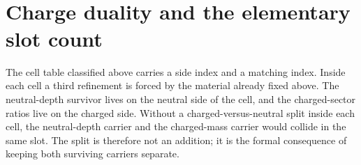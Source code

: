 \documentclass[11pt]{article}
\begin{document}
\begin{code}
\<%
\\
%
\\[\AgdaEmptyExtraSkip]%
\>[0]\AgdaSpace{}%
\AgdaSymbol{:}\AgdaSpace{}%
\<%
\\
\>[0]\AgdaSpace{}%
\AgdaSymbol{=}\AgdaSpace{}%
\<%
\\
\>[0][@{}l@{\AgdaIndent{0}}]%
\>[2]\AgdaSymbol{\{}\AgdaSpace{}%
%
\>[29]\AgdaSymbol{=}\AgdaSpace{}%
\<%
\\
%
\>[2]\AgdaSymbol{;}\AgdaSpace{}%
%
\>[29]\AgdaSymbol{=}\AgdaSpace{}%
\<%
\\
%
\>[2]\AgdaSymbol{;}\AgdaSpace{}%
\AgdaSpace{}%
\AgdaSymbol{=}\AgdaSpace{}%
\<%
\\
%
\>[2]\AgdaSymbol{;}\AgdaSpace{}%
%
\>[29]\AgdaSymbol{=}\AgdaSpace{}%
\<%
\\
%
\>[2]\AgdaSymbol{;}\AgdaSpace{}%
%
\>[29]\AgdaSymbol{=}\AgdaSpace{}%
\<%
\\
%
\>[2]\AgdaSymbol{;}\AgdaSpace{}%
%
\>[29]\AgdaSymbol{=}\AgdaSpace{}%
\<%
\\
%
\>[2]\AgdaSymbol{;}\AgdaSpace{}%
%
\>[29]\AgdaSymbol{=}\AgdaSpace{}%
\<%
\\
%
\>[2]\AgdaSymbol{\}}\<%
\end{code}

\section{Charge duality and the elementary slot count}

The cell table classified above carries a side index and a matching
index.  Inside each cell a third refinement is forced by the material
already fixed above.  The neutral-depth survivor lives on the neutral side of
the cell, and the charged-sector ratios live on the charged side.  Without a
charged-versus-neutral split inside each cell, the neutral-depth carrier and
the charged-mass carrier would collide in the same slot.  The split is
therefore not an addition; it is the formal consequence of keeping both
surviving carriers separate.
\end{document}
